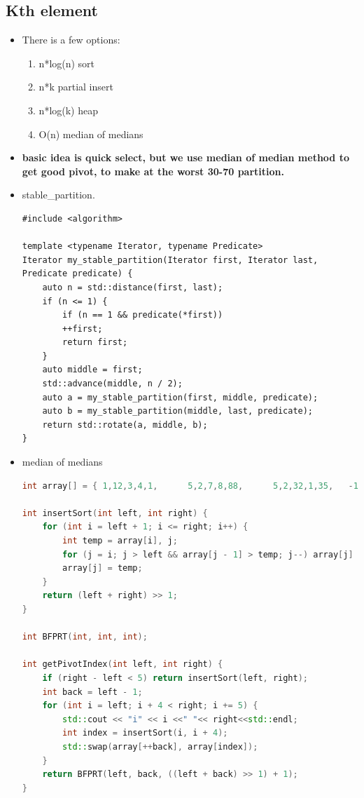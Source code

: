 \documentclass[a4paper,11pt,twoside]{book}
\begin{document}
\subsection{Kth element}
\begin{itemize}
	\item There is a few options:
	\begin{enumerate}
		\item n*log(n) sort
		\item n*k partial insert 
		\item n*log(k) heap 
		\item O(n) median of medians 
	\end{enumerate}

	\item \textbf{basic idea is quick select, but we use median of median method to get good pivot, to make at the worst 30-70 partition.}
	
	\item stable\_partition.
\begin{lstlisting}
#include <algorithm>

template <typename Iterator, typename Predicate>
Iterator my_stable_partition(Iterator first, Iterator last,
Predicate predicate) {
	auto n = std::distance(first, last);
	if (n <= 1) {
		if (n == 1 && predicate(*first))
		++first;
		return first;
	}
	auto middle = first;
	std::advance(middle, n / 2);
	auto a = my_stable_partition(first, middle, predicate);
	auto b = my_stable_partition(middle, last, predicate);
	return std::rotate(a, middle, b);
}	
\end{lstlisting}
	
	\item median of medians
\begin{lstlisting}[frame=single, language=c++, basicstyle=\scriptsize]
int array[] = { 1,12,3,4,1,      5,2,7,8,88,      5,2,32,1,35,   -1,7,5,38,-11 };

int insertSort(int left, int right) {
	for (int i = left + 1; i <= right; i++) {
		int temp = array[i], j;
		for (j = i; j > left && array[j - 1] > temp; j--) array[j] = array[j - 1];
		array[j] = temp;
	}
	return (left + right) >> 1;
}

int BFPRT(int, int, int);

int getPivotIndex(int left, int right) {
	if (right - left < 5) return insertSort(left, right);
	int back = left - 1;
	for (int i = left; i + 4 < right; i += 5) {
		std::cout << "i" << i <<" "<< right<<std::endl;
		int index = insertSort(i, i + 4);
		std::swap(array[++back], array[index]);
	}
	return BFPRT(left, back, ((left + back) >> 1) + 1);
}



\end{lstlisting}
\end{itemize}
\end{document}
